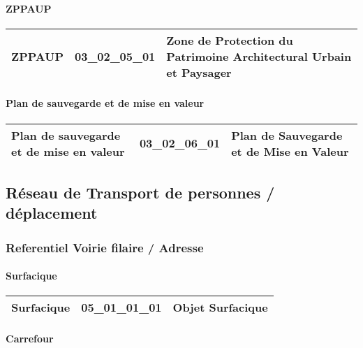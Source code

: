 \documentclass[12pt,titlepage,oneside]{book}
\begin{document}
\paragraph{ZPPAUP}
\noindent
\vspace{\baselineskip}

\renewcommand{\arraystretch}{1.2}
\begin{supertabular}{|p{10cm}|c|p{15cm}|}
 ZPPAUP & 03\_02\_05\_01 & Zone de Protection du Patrimoine Architectural Urbain et Paysager\\
\hline
\end{supertabular}


\paragraph{Plan de sauvegarde et de mise en valeur}
\noindent
\vspace{\baselineskip}

\renewcommand{\arraystretch}{1.2}
\begin{supertabular}{|p{10cm}|c|p{15cm}|}
 Plan de sauvegarde et de mise en valeur & 03\_02\_06\_01 & Plan de Sauvegarde et de Mise en Valeur\\
\hline
\end{supertabular}
\subsection{Réseau de Transport de personnes / déplacement}
\subsubsection{\large Referentiel Voirie filaire / Adresse}
\paragraph{Surfacique}
\noindent
\vspace{\baselineskip}

\renewcommand{\arraystretch}{1.2}
\begin{supertabular}{|p{10cm}|c|p{15cm}|}
 Surfacique & 05\_01\_01\_01 & Objet Surfacique\\
\hline
\end{supertabular}


\paragraph{Carrefour}
\noindent
\vspace{\baselineskip}
\end{document}
